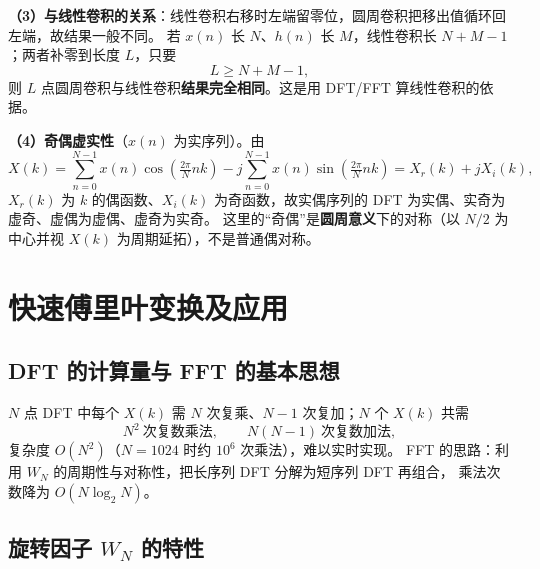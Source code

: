 \textbf{（3）与线性卷积的关系}：线性卷积右移时左端留零位，圆周卷积把移出值循环回左端，故结果一般不同。
若 $x(n)$ 长 $N$、$h(n)$ 长 $M$，线性卷积长 $N+M-1$；两者补零到长度 $L$，只要
\begin{equation}
L\ge N+M-1,
\end{equation}
则 $L$ 点圆周卷积与线性卷积\textbf{结果完全相同}。这是用 DFT/FFT 算线性卷积的依据。

\textbf{（4）奇偶虚实性}（$x(n)$ 为实序列）。由
\begin{equation}
X(k)=\sum_{n=0}^{N-1}x(n)\cos\!\left(\tfrac{2\pi}{N}nk\right)
-j\sum_{n=0}^{N-1}x(n)\sin\!\left(\tfrac{2\pi}{N}nk\right)
=X_r(k)+jX_i(k),
\end{equation}
$X_r(k)$ 为 $k$ 的偶函数、$X_i(k)$ 为奇函数，故实偶序列的 DFT 为实偶、实奇为虚奇、虚偶为虚偶、虚奇为实奇。
这里的“奇偶”是\textbf{圆周意义}下的对称（以 $N/2$ 为中心并视 $X(k)$ 为周期延拓），不是普通偶对称。

\section{快速傅里叶变换及应用}

\subsection{DFT 的计算量与 FFT 的基本思想}

$N$ 点 DFT 中每个 $X(k)$ 需 $N$ 次复乘、$N-1$ 次复加；$N$ 个 $X(k)$ 共需
\begin{equation}
N^2\ \text{次复数乘法},\qquad N(N-1)\ \text{次复数加法},
\end{equation}
复杂度 $O(N^2)$（$N=1024$ 时约 $10^6$ 次乘法），难以实时实现。
FFT 的思路：利用 $W_N$ 的周期性与对称性，把长序列 DFT 分解为短序列 DFT 再组合，
乘法次数降为 $O(N\log_2N)$。

\subsection{旋转因子 $W_N$ 的特性}

